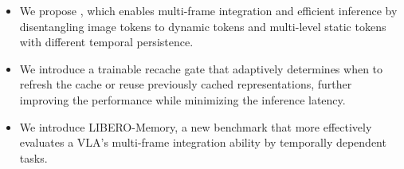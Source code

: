 \begin{itemize}[noitemsep,topsep=0pt,leftmargin=*]
    \item We propose \dysta{}, which enables multi-frame integration and efficient inference by disentangling image tokens to dynamic tokens and multi-level static tokens with different temporal persistence.
    \item We introduce a trainable recache gate that adaptively determines when to refresh the cache or reuse previously cached representations, further improving the performance while minimizing the inference latency.
    \item We introduce LIBERO-Memory, a new benchmark that more effectively evaluates a VLA’s multi-frame integration ability by temporally dependent tasks.
\end{itemize}
